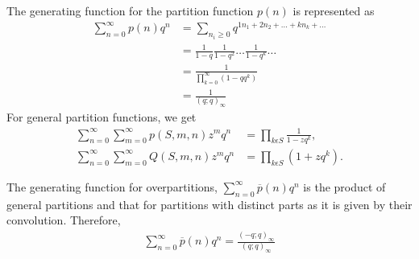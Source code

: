 The generating function for the partition function $p(n)$ is represented as
\begin{align*}
\sum_{n=0}^\infty p(n)q^n
&= \sum_{n_i \geq 0}q^{1n_1 + 2n_2 + \dots + kn_k + \dots}\\
&= \frac{1}{1-q} \frac{1}{1-q^2} \dots \frac{1}{1-q^k} \dots\\
&= \frac{1}{\prod_{k=0}^\infty (1-qq^k)}\\
&= \frac{1}{(q;q)_\infty}
\end{align*}
\newpage
For general partition functions, we get
\begin{align*}
\sum_{n=0}^\infty \sum_{m=0}^\infty p( S, m, n )z^mq^n &= \prod_{k \epsilon S} \frac{1}{1-zq^k},\\
\sum_{n=0}^\infty \sum_{m=0}^\infty Q( S, m, n )z^mq^n &= \prod_{k \epsilon S} (1+zq^k).
\end{align*}

The generating function for overpartitions,  $\sum_{n=0}^\infty \overline p(n)q^n$ is the product of general partitions and that for partitions with distinct parts as it is given by their convolution. Therefore,
\begin{align*}
\sum_{n=0}^\infty \overline p(n)q^n = \frac{(-q;q)_\infty}{(q;q)_\infty}
\end{align*}


